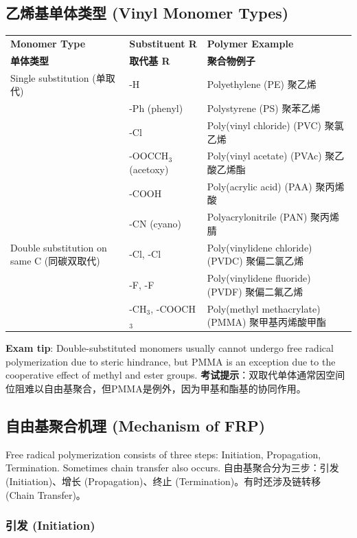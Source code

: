 \documentclass[12pt,a4paper]{ctexart}
\begin{document}
\subsection{乙烯基单体类型 (Vinyl Monomer Types)}

\begin{longtable}{p{4cm}p{5cm}p{5cm}}
\toprule
\textbf{Monomer Type} & \textbf{Substituent R} & \textbf{Polymer Example} \\
\textbf{单体类型} & \textbf{取代基 R} & \textbf{聚合物例子} \\
\midrule
Single substitution (单取代) & -H & Polyethylene (PE) 聚乙烯 \\
& -Ph (phenyl) & Polystyrene (PS) 聚苯乙烯 \\
& -Cl & Poly(vinyl chloride) (PVC) 聚氯乙烯 \\
& -OOCCH$_3$ (acetoxy) & Poly(vinyl acetate) (PVAc) 聚乙酸乙烯酯 \\
& -COOH & Poly(acrylic acid) (PAA) 聚丙烯酸 \\
& -CN (cyano) & Polyacrylonitrile (PAN) 聚丙烯腈 \\
Double substitution on same C (同碳双取代) & -Cl, -Cl & Poly(vinylidene chloride) (PVDC) 聚偏二氯乙烯 \\
& -F, -F & Poly(vinylidene fluoride) (PVDF) 聚偏二氟乙烯 \\
& -CH$_3$, -COOCH$_3$ & Poly(methyl methacrylate) (PMMA) 聚甲基丙烯酸甲酯 \\
\bottomrule
\end{longtable}

\textbf{Exam tip}: Double-substituted monomers usually cannot undergo free radical polymerization due to steric hindrance, but PMMA is an exception due to the cooperative effect of methyl and ester groups.  
\textbf{考试提示}：双取代单体通常因空间位阻难以自由基聚合，但PMMA是例外，因为甲基和酯基的协同作用。

\subsection{自由基聚合机理 (Mechanism of FRP)}

Free radical polymerization consists of three steps: Initiation, Propagation, Termination. Sometimes chain transfer also occurs.  
自由基聚合分为三步：引发 (Initiation)、增长 (Propagation)、终止 (Termination)。有时还涉及链转移 (Chain Transfer)。

\subsubsection{引发 (Initiation)}
\end{document}
